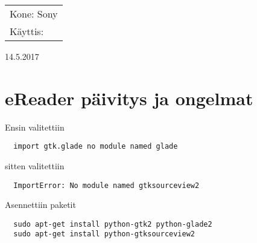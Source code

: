\documentclass[main.tex]{subfiles}
\begin{document}
\thispagestyle{empty}
\begin{tabular}[t]{l}
Kone: Sony\\
Käyttis: 
\end{tabular}
\hfill 14.5.2017

\section{eReader päivitys ja ongelmat}

Ensin valitettiin

\begin{lstlisting}
  import gtk.glade no module named glade
\end{lstlisting}

sitten valitettiin

\begin{lstlisting}
  ImportError: No module named gtksourceview2
\end{lstlisting}

Asennettiin paketit

\begin{lstlisting}
  sudo apt-get install python-gtk2 python-glade2
  sudo apt-get install python-gtksourceview2
\end{lstlisting}
\end{document}
